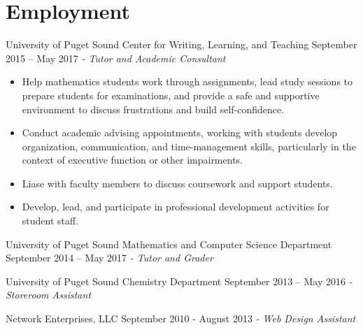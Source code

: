 \section{Employment}
University of Puget Sound Center for Writing, Learning, and Teaching \hfill September 2015 – May 2017 \newline 
\textit{ - Tutor and Academic Consultant}  \\
 \vspace{-4.5mm}
 \begin{itemize}
 \item Help mathematics students work through assignments, lead study sessions to prepare students for examinations, and provide a safe and supportive environment to discuss frustrations and build self-confidence.
 \item Conduct academic advising appointments, working with students develop organization, communication, and time-management skills, particularly in the context of executive function or other impairments.
 \item Liase with faculty members to discuss coursework and support students.
 \item Develop, lead, and participate in professional development activities for student staff.
 \end{itemize}
\vspace{-3.5mm}
University of Puget Sound Mathematics and Computer Science Department \hfill  September 2014 – May 2017 \newline
\textit{- Tutor and Grader} \\
  \vspace{-4.5mm}
    \vspace{-3.5mm}
    
University of Puget Sound Chemistry Department \hfill September 2013 – May 2016 \newline 
\textit{- Storeroom Assistant} \\
  \vspace{-4.5mm}
    \vspace{-3.5mm}

Network Enterprises, LLC \hfill September 2010 - August 2013 \newline 
\textit{- Web Design Assistant} \hfill
    \vspace{-3.5mm}

